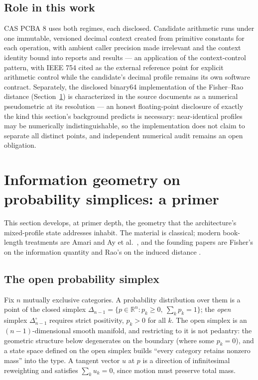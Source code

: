 \subsection{Role in this work}\label{ch02:arith:role}

CAS PCBA 8 uses both regimes, each disclosed. Candidate arithmetic runs
under one immutable, versioned decimal context created from primitive
constants for each operation, with ambient caller precision made
irrelevant and the context identity bound into reports and results ---
an application of the context-control pattern, with IEEE 754
\cite{ieee754} cited as the external reference point for explicit
arithmetic control while the candidate's decimal profile remains its own
software contract. Separately, the disclosed binary64 implementation of
the Fisher--Rao distance (Section~\ref{ch02:infogeo}) is characterized in
the source documents as a numerical pseudometric at its resolution ---
an honest floating-point disclosure of exactly the kind this section's
background predicts is necessary: near-identical profiles may be
numerically indistinguishable, so the implementation does not claim to
separate all distinct points, and independent numerical audit remains an
open obligation.

\section{Information geometry on probability simplices: a primer}\label{ch02:infogeo}

This section develops, at primer depth, the geometry that the
architecture's mixed-profile state addresses inhabit. The material is
classical; modern book-length treatments are Amari \cite{amari} and Ay et
al.\ \cite{ay}, and the founding papers are Fisher's on the information
quantity \cite{fisher} and Rao's on the induced distance \cite{rao}.

\subsection{The open probability simplex}\label{ch02:infogeo:simplex}

Fix $n$ mutually exclusive categories. A probability distribution over
them is a point of the closed simplex
$\Delta_{n-1}=\{p\in\mathbb{R}^n : p_k\ge 0,\ \sum_k p_k=1\}$; the
\emph{open} simplex $\Delta_{n-1}^{\circ}$ requires strict positivity,
$p_k>0$ for all $k$. The open simplex is an $(n-1)$-dimensional smooth
manifold, and restricting to it is not pedantry: the geometric structure
below degenerates on the boundary (where some $p_k=0$), and a state
space defined on the open simplex builds ``every category retains
nonzero mass'' into the type. A tangent vector $u$ at $p$ is a direction
of infinitesimal reweighting and satisfies $\sum_k u_k=0$, since motion
must preserve total mass.

